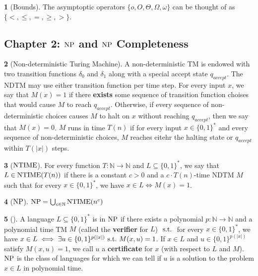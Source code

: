 \documentclass[10pt]{article}
\theoremstyle{definition}
\newtheorem{note}{}[section]
\begin{document}
\begin{note}[Bounds]
  The asymptoptic operators $\{o, O, \Theta, \Omega, \omega\}$ can be thought
  of as $\{ <, \leq, =, \geq, > \}$.
\end{note}

\subsection*{Chapter 2: $\mathrm{NP}$ and $\mathrm{NP}$ Completeness}
\begin{note}[Non-deterministic Turing Machine]
  A non-deterministic TM is endowed with two transition functions
  $\delta_0$ and $\delta_1$ along with a special accept state $q_{accept}$.
  The NDTM may use either transition function per time step.
  For every input $x$, we say that $M(x) = 1$ if there \textbf{exists}
  some sequence of transition function choises
  that would cause $M$ to reach $q_{accept}$.
  Otherwise, if every sequence of non-deterministic choices causes $M$ to halt
  on $x$ without reaching $q_{accept}$, then we say that $M(x) = 0$.
  $M$ runs in time $T(n)$ if for every input $x \in \{0, 1\}^\ast$ and every
  sequence of non-deterministic choices, $M$ reaches eitehr the halting state
  or $q_{accept}$ within $T(|x|)$ steps.
\end{note}

\begin{note}[$\mathrm{NTIME}$]
  For every function $T : \mathbb{N} \to \mathbb{N}$ and
  $L \subseteq \{0, 1\}^\ast$, we say that $L \in \mathrm{NTIME}(T(n))$ if there is
  a constant $c > 0$ and a $c \cdot T(n)$-time NDTM $M$ such that for
  every $x \in \{0, 1\}^\ast$, we have $x \in L \iff M(x) = 1$.
\end{note}

\begin{note}[$\mathrm{NP}$]
  $\mathrm{NP} = \bigcup_{c \in \mathbb{N}} \mathrm{NTIME}(n^c)$
\end{note}

\begin{note}[]
  A language $L \subseteq \{0, 1\}^\ast$ is in $\mathrm{NP}$ if there exists a
  polynomial $p : \mathbb{N} \to \mathbb{N}$ and a polynomial time TM $M$
  (called the \textbf{verifier} for $L$) $\mathrm{\ s.t.\ }$ for every
  $x \in \{0, 1\}^\ast$, we have
  $x \in L \iff \exists u \in \{0, 1\}^{p(|x|)} \mathrm{\ s.t.\ } M(x, u) = 1$.
  If $x \in L$ and $u \in \{0, 1\}^{p(|x|)}$ satisfy $M(x, u) = 1$,
  we call $u$ a \textbf{certificate} for $x$ (with respect to $L$ and $M$).
  $\mathrm{NP}$ is the class of languages for which we can tell if
  $u$ is a solution to the problem $x \in L$ in polynomial time.
\end{note}
\end{document}

